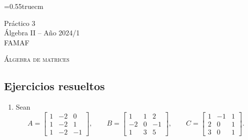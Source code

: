 \documentclass[a4paper,12pt,twoside,spanish,reqno]{amsbook}
\numberwithin{equation}{section}
\begin{document}
    \baselineskip=0.55truecm %
    
    
    {\bf \begin{center} Práctico 3 \\ Álgebra  II -- Año 2024/1 \\ FAMAF \end{center}}



\centerline{\textsc{\'Algebra de matrices}}
\subsection*{Ejercicios resueltos}

\begin{enumerate}[topsep=6pt,itemsep=.4cm]


\item\label{ej} Sean
$$
A= \begin{bmatrix} 1&-2&0\\ 1&-2&1\\ 1&-2&-1\end{bmatrix},\quad
\quad B= \begin{bmatrix}1&1&2\\ -2&0&-1\\ 1&3&5 \end{bmatrix},
\quad\quad C=\begin{bmatrix}1&-1&1\\ 2&0&1\\ 3&0&1 \end{bmatrix}.
$$


\end{enumerate}
\end{document}
